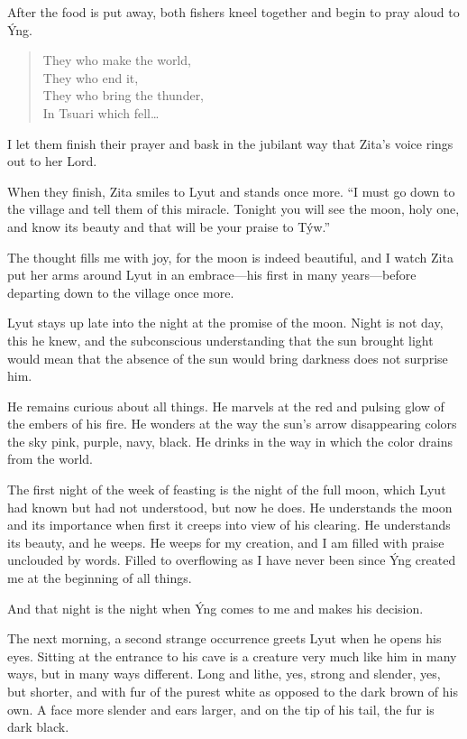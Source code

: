 After the food is put away, both fishers kneel together and begin to pray aloud to Ýng.

\begin{verse}
They who make the world, \\
They who end it, \\
They who bring the thunder, \\
In Tsuari which fell\ldots
\end{verse}

I let them finish their prayer and bask in the jubilant way that Zita's voice rings out to her Lord.

When they finish, Zita smiles to Lyut and stands once more. ``I must go down to the village and tell them of this miracle. Tonight you will see the moon, holy one, and know its beauty and that will be your praise to Týw.''

The thought fills me with joy, for the moon is indeed beautiful, and I watch Zita put her arms around Lyut in an embrace---his first in many years---before departing down to the village once more.

\secdiv

\noindent Lyut stays up late into the night at the promise of the moon. Night is not day, this he knew, and the subconscious understanding that the sun brought light would mean that the absence of the sun would bring darkness does not surprise him.

He remains curious about all things. He marvels at the red and pulsing glow of the embers of his fire. He wonders at the way the sun's arrow disappearing colors the sky pink, purple, navy, black. He drinks in the way in which the color drains from the world.

The first night of the week of feasting is the night of the full moon, which Lyut had known but had not understood, but now he does. He understands the moon and its importance when first it creeps into view of his clearing. He understands its beauty, and he weeps. He weeps for my creation, and I am filled with praise unclouded by words. Filled to overflowing as I have never been since Ýng created me at the beginning of all things.

And that night is the night when Ýng comes to me and makes his decision.

The next morning, a second strange occurrence greets Lyut when he opens his eyes. Sitting at the entrance to his cave is a creature very much like him in many ways, but in many ways different. Long and lithe, yes, strong and slender, yes, but shorter, and with fur of the purest white as opposed to the dark brown of his own. A face more slender and ears larger, and on the tip of his tail, the fur is dark black.

